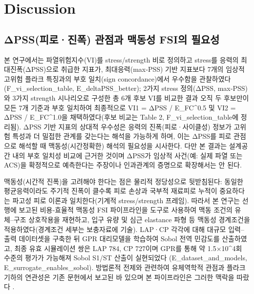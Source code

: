 \documentclass[preprint,12pt]{elsarticle}
\begin{document}
\section{Discussion}

\subsection{ΔPSS(피로·진폭) 관점과 맥동성 FSI의 필요성}
본 연구에서는 파열위험지수(VI)를 stress/strength 비로 정의하고 stress를 응력의 최대진폭(ΔPSS)으로 취급한 지표가, 최대응력(max‑PSS) 기반 지표보다 7개의 임상적 고위험 플라크 특징과의 부호 일치(sign concordance)에서 우수함을 관찰하였다 (F\_vi\_selection\_table, E\_deltaPSS\_better); 2가지 stress 정의(ΔPSS, max‑PSS)와 3가지 strength 시나리오로 구성한 총 6개 후보 VI를 비교한 결과 오직 두 후보만이 모든 7개 기준과 부호 일치하여 최종적으로 VI1 = ΔPSS / E\_FC\textasciicircum 0.5 및 VI2 = ΔPSS / E\_FC\textasciicircum 1.0을 채택하였다(후보 비교는 Table 2, F\_vi\_selection\_table에 정리됨). ΔPSS 기반 지표의 상대적 우수성은 응력의 진폭(피로·사이클성) 정보가 고위험 특성과 더 밀접한 관계를 갖는다는 해석을 가능하게 하며, 이는 ΔPSS를 피로 관점으로 해석할 때 맥동성(시간정확한) 해석의 필요성을 시사한다. 다만 본 결과는 설계공간 내의 부호 일치성 비교에 근거한 것이며 ΔPSS가 임상적 사건(예: 실제 파열 또는 ACS)을 확정적으로 예측한다는 주장이나 인과관계의 증명으로 확장해서는 안 된다.

맥동성(시간적 진폭)을 고려해야 한다는 점은 물리적 정당성으로 뒷받침된다: 동일한 평균응력이라도 주기적 진폭이 클수록 피로 손상과 국부적 재료피로 누적이 중요하다는 파고성 피로 이론과 일치한다(기계적 stress/strength 프레임). 따라서 본 연구는 선행에 보고된 비용‑효율적 맥동성 FSI 파이프라인을 도구로 사용하여 맥동 조건의 유체–구조 상호작용을 재현하고, 입구 유량 및 심근 elastance 파형 등 맥동성 경계조건을 적용하였다(경계조건 세부는 보충자료에 기술). LAP·CP 각각에 대해 대규모 입력–출력 데이터셋을 구축한 뒤 GPR 대리모델을 학습하여 Sobol 전역 민감도를 산출하였고, 최종 유효 시뮬레이션 쌍은 LAP 784, CP 727이며 GPR를 통해 약 1.5×10\textasciicircum 4회 수준의 평가가 가능해져 Sobol S1/ST 산출이 실현되었다 (E\_dataset\_and\_models, E\_surrogate\_enables\_sobol). 방법론적 전제와 관련하여 유체역학적 관점과 플라크 기하의 연관성은 기존 문헌에서 보고된 바 있으며 본 파이프라인은 그러한 맥락을 따랐다 \cite{brown2016} \cite{choi2015} \cite{stefanadis2017} \cite{chaichana2012}.
\end{document}
